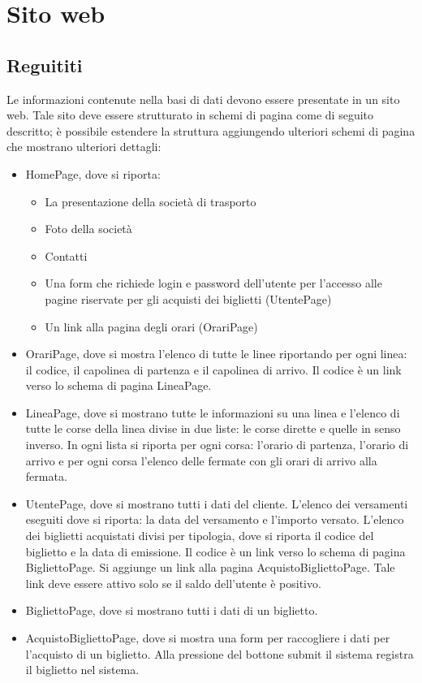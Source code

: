 \documentclass[a4paper,11pt]{book}
\begin{document}
\chapter{Sito web}
\section{Reguititi}
Le informazioni contenute nella basi di dati devono essere presentate in un sito web. Tale sito deve essere strutturato in schemi di pagina come di seguito descritto; è possibile estendere la struttura aggiungendo ulteriori schemi di pagina che mostrano ulteriori dettagli:
\begin{itemize}
\item HomePage, dove si riporta:
	\begin{itemize}
	\item La presentazione della società di trasporto
	\item Foto della società
	\item Contatti
	\item Una form che richiede login e password dell'utente per l'accesso alle pagine riservate per gli acquisti dei biglietti (UtentePage)
	\item Un link alla pagina degli orari (OrariPage)
	\end{itemize}
\item OrariPage, dove si mostra l'elenco di tutte le linee riportando per ogni linea: il codice, il capolinea di partenza e il capolinea di arrivo. Il codice è un link verso lo schema di pagina LineaPage.
\item LineaPage, dove si mostrano tutte le informazioni su una linea e l'elenco di tutte le corse della linea divise in due liste: le corse dirette e quelle in senso inverso. In ogni lista si riporta per ogni corsa: l'orario di partenza, l'orario di arrivo e per ogni corsa l'elenco delle fermate con gli orari di arrivo alla fermata.
\item UtentePage, dove si mostrano tutti i dati del cliente. L'elenco dei versamenti eseguiti dove si riporta: la data del versamento e l'importo versato. L'elenco dei biglietti acquistati divisi per tipologia, dove si riporta il codice del biglietto e la data di emissione. Il codice è un link verso lo schema di pagina BigliettoPage. Si aggiunge un link alla pagina AcquistoBigliettoPage. Tale link deve essere attivo solo se il saldo dell'utente è positivo.
\item BigliettoPage, dove si mostrano tutti i dati di un biglietto.
\item AcquistoBigliettoPage, dove si mostra una form per raccogliere i dati per l'acquisto di un biglietto. Alla pressione del bottone submit il sistema registra il biglietto nel sistema.
\end{itemize}
\end{document}
